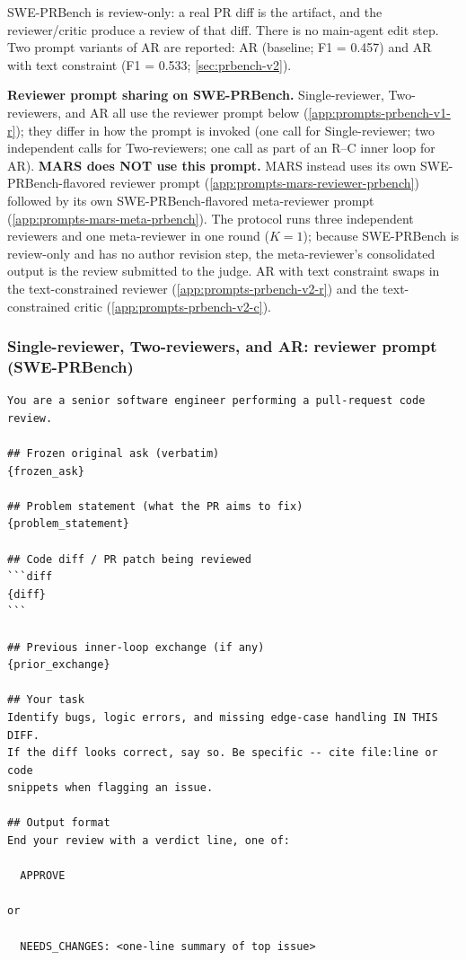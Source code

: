 \documentclass{article}
\begin{document}
SWE-PRBench is review-only: a real PR diff is the artifact, and the
reviewer/critic produce a review of that diff. There is no main-agent
edit step. Two prompt variants of AR are reported: AR (baseline; F1 = 0.457)
and AR with text constraint (F1 = 0.533; \autoref{sec:prbench-v2}).

\textbf{Reviewer prompt sharing on SWE-PRBench.}
Single-reviewer, Two-reviewers, and AR all use the reviewer prompt
below (\autoref{app:prompts-prbench-v1-r}); they differ in how the
prompt is invoked (one call for Single-reviewer; two independent
calls for Two-reviewers; one call as part of an R--C inner loop for
AR). \textbf{MARS does NOT use this prompt.} MARS instead uses
its own SWE-PRBench-flavored reviewer prompt
(\autoref{app:prompts-mars-reviewer-prbench}) followed by its own
SWE-PRBench-flavored meta-reviewer prompt
(\autoref{app:prompts-mars-meta-prbench}). The protocol runs three
independent reviewers and one meta-reviewer in one round ($K{=}1$);
because SWE-PRBench is review-only and has no author revision step,
the meta-reviewer's consolidated output is the review submitted to
the judge. AR with text constraint swaps in the text-constrained reviewer
(\autoref{app:prompts-prbench-v2-r}) and the text-constrained critic
(\autoref{app:prompts-prbench-v2-c}).

\subsubsection{Single-reviewer, Two-reviewers, and AR: reviewer prompt (SWE-PRBench)}
\label{app:prompts-prbench-v1-r}

\begin{footnotesize}
\begin{verbatim}
You are a senior software engineer performing a pull-request code review.

## Frozen original ask (verbatim)
{frozen_ask}

## Problem statement (what the PR aims to fix)
{problem_statement}

## Code diff / PR patch being reviewed
```diff
{diff}
```

## Previous inner-loop exchange (if any)
{prior_exchange}

## Your task
Identify bugs, logic errors, and missing edge-case handling IN THIS DIFF.
If the diff looks correct, say so. Be specific -- cite file:line or code
snippets when flagging an issue.

## Output format
End your review with a verdict line, one of:

  APPROVE

or

  NEEDS_CHANGES: <one-line summary of top issue>
\end{verbatim}
\end{footnotesize}
\end{document}
